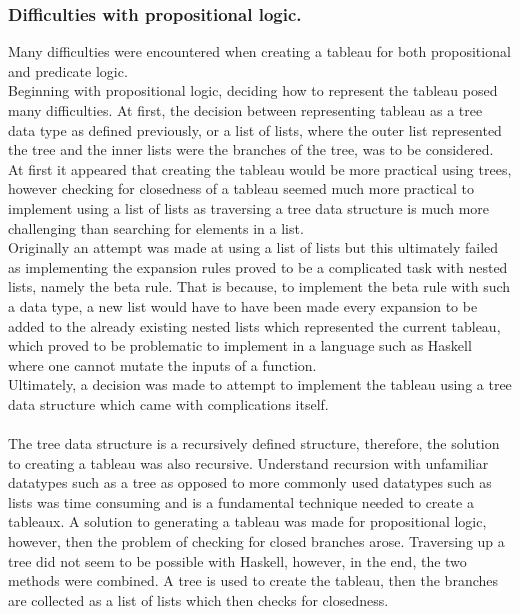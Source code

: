 \documentclass{article}%
\begin{document}
\subsubsection{Difficulties with propositional logic.} Many difficulties were encountered when creating a tableau for both propositional and predicate logic. \\ 
Beginning with propositional logic, deciding how to represent the tableau posed many difficulties. At first, the decision between representing tableau as a tree data type as defined previously, or a list of lists, where the outer list represented the tree and the inner lists were the branches of the tree,  was to be considered. At first it appeared that creating the tableau would be more practical using trees, however checking for closedness of a tableau seemed much more practical to implement using a list of lists as traversing a tree data structure is much more challenging than searching for elements in a list. \\
Originally an attempt was made at using a list of lists but this ultimately failed as implementing the expansion rules proved to be a complicated task with nested lists, namely the beta rule. That is because, to implement the beta rule with such a data type, a new list would have to have been made every expansion to be added to the already existing nested lists which represented the current tableau, which proved to be problematic to implement in a language such as Haskell where one cannot mutate the inputs of a function. \\ 
Ultimately, a decision was made to attempt to implement the tableau using a tree data structure which came with complications itself. \\\\
The tree data structure is a recursively defined structure, therefore, the solution to creating a tableau was also recursive. Understand recursion with unfamiliar datatypes such as a tree as opposed to more commonly used datatypes such as lists was time consuming and is a fundamental technique needed to create a tableaux. A solution to generating a tableau was made for propositional logic, however, then the problem of checking for closed branches arose. Traversing up a tree did not seem to be possible with Haskell, however, in the end, the two methods were combined. A tree is used to create the tableau, then the branches are collected as a list of lists which then checks for closedness. 
\end{document}

